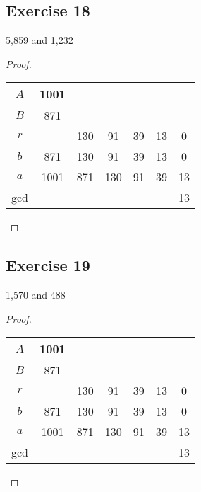 \documentclass[14pt]{extarticle}
\begin{document}
\subsection{Exercise 18}
5,859 and 1,232

\begin{proof}
    \begin{center}
        \begin{tabular}{|c|c|c|c|c|c|c|}
            \hline
            $A$ & 1001 &     &     &    &    &    \\
            \hline
            $B$ & 871  &     &     &    &    &    \\
            \hline
            $r$ &      & 130 & 91  & 39 & 13 & 0  \\
            \hline
            $b$ & 871  & 130 & 91  & 39 & 13 & 0  \\
            \hline
            $a$ & 1001 & 871 & 130 & 91 & 39 & 13 \\
            \hline
            gcd &      &     &     &    &    & 13 \\
            \hline
        \end{tabular}
    \end{center}
\end{proof}

\subsection{Exercise 19}
1,570 and 488

\begin{proof}
    \begin{center}
        \begin{tabular}{|c|c|c|c|c|c|c|}
            \hline
            $A$ & 1001 &     &     &    &    &    \\
            \hline
            $B$ & 871  &     &     &    &    &    \\
            \hline
            $r$ &      & 130 & 91  & 39 & 13 & 0  \\
            \hline
            $b$ & 871  & 130 & 91  & 39 & 13 & 0  \\
            \hline
            $a$ & 1001 & 871 & 130 & 91 & 39 & 13 \\
            \hline
            gcd &      &     &     &    &    & 13 \\
            \hline
        \end{tabular}
    \end{center}
\end{proof}
\end{document}
